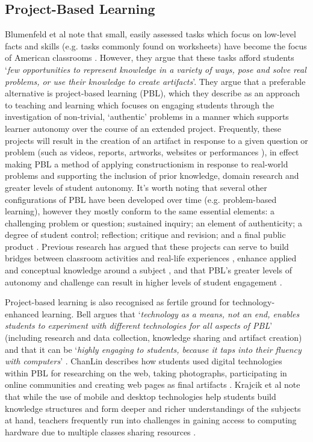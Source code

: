 \documentclass[,hyphens]{sigchi}
\begin{document}
\subsection{Project-Based Learning}
Blumenfeld et al note that small, easily assessed tasks which focus on low-level facts and skills (e.g. tasks commonly found on worksheets) have become the focus of American classrooms \cite{Blumenfeld1991}. However, they argue that these tasks afford students `\textit{few opportunities to represent knowledge in a variety of ways, pose and solve real problems, or use their knowledge to create artifacts}'. They argue that a preferable alternative is project-based learning (PBL), which they describe as an approach to teaching and learning which focuses on engaging students through the investigation of non-trivial, `authentic' problems in a manner which supports learner autonomy over the course of an extended project. Frequently, these projects will result in the creation of an artifact in response to a given question or problem (such as videos, reports, artworks, websites or performances \cite{Holubova2008}), in effect making PBL a method of applying constructionism in response to real-world problems and supporting the inclusion of prior knowledge, domain research and greater levels of student autonomy. It's worth noting that several other configurations of PBL have been developed over time (e.g. problem-based learning), however they mostly conform to the same essential elements: a challenging problem or question; sustained inquiry; an element of authenticity; a degree of student control; reflection; critique and revision; and a final public product \cite{Larmer2015}. Previous research has argued that these projects can serve to build bridges between classroom activities and real-life experiences \cite{Blumenfeld1991}, enhance applied and conceptual knowledge around a subject \cite{Boaler1999}, and that PBL's greater levels of autonomy and challenge can result in higher levels of student engagement \cite{Wurdinger2007}.

Project-based learning is also recognised as fertile ground for technology-enhanced learning. Bell argues that `\textit{technology as a means, not an end, enables students to experiment with different technologies for all aspects of PBL}' (including research and data collection, knowledge sharing and artifact creation) and that it can be `\textit{highly engaging to students, because it taps into their fluency with computers}' \cite{Bell2010}. ChanLin describes how students used digital technologies within PBL for researching on the web, taking photographs, participating in online communities and creating web pages as final artifacts \cite{ChanLin2008}. Krajcik et al note that while the use of mobile and desktop technologies help students build knowledge structures and form deeper and richer understandings of the subjects at hand, teachers frequently run into challenges in gaining access to computing hardware due to multiple classes sharing resources \cite{Krajcik2006}.
\end{document}
